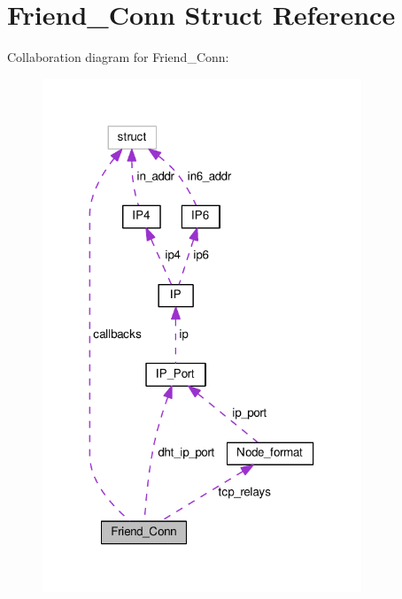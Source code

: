 \hypertarget{struct_friend___conn}{\section{Friend\+\_\+\+Conn Struct Reference}
\label{struct_friend___conn}
}


Collaboration diagram for Friend\+\_\+\+Conn\+:
\nopagebreak
\begin{figure}[H]
\begin{center}
\leavevmode
\includegraphics[width=270pt]{struct_friend___conn__coll__graph}
\end{center}
\end{figure}
